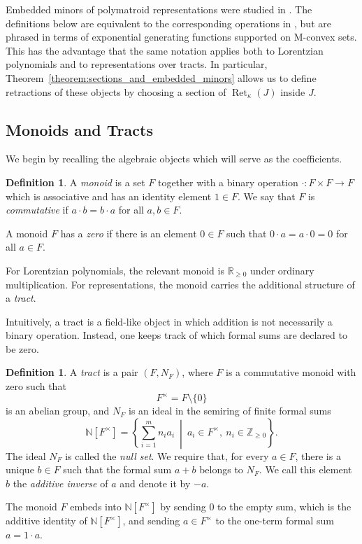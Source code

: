 \documentclass[11pt]{article}
\theoremstyle{definition}
\newtheorem{definition}[theorem]{Definition}
\theoremstyle{remark}
\newcommand{\Zgeq}{\mathbb{Z}_{\geq 0}}       %
\newcommand{\R}{\mathbb{R}}
\DeclareMathOperator{\Ret}{Ret}                %
\newcommand{\RetK}{\Ret_{\kappa}}              %
\begin{document}
Embedded minors of polymatroid representations were studied in \cite{baker2025representationtheorypolymatroids}. The definitions below are equivalent to the corresponding operations in \cite{baker2025representationtheorypolymatroids}, but are phrased in terms of exponential generating functions supported on M-convex sets. This has the advantage that the same notation applies both to Lorentzian polynomials and to representations over tracts. In particular, Theorem~\ref{theorem:sections_and_embedded_minors} allows us to define retractions of these objects by choosing a section of $\RetK(J)$ inside $J$.

\subsection{Monoids and Tracts}

We begin by recalling the algebraic objects which will serve as the coefficients.

\begin{definition}
    A \emph{monoid} is a set $F$ together with a binary operation $\cdot \colon F\times F\to F$ which is associative and has an identity element $1\in F$. We say that $F$ is \emph{commutative} if $a\cdot b=b\cdot a$ for all $a,b\in F$.

    A monoid $F$ has a \emph{zero} if there is an element $0\in F$ such that $0\cdot a=a\cdot 0=0$ for all $a\in F$.
\end{definition}

For Lorentzian polynomials, the relevant monoid is $\R_{\geq 0}$ under ordinary multiplication. For representations, the monoid carries the additional structure of a \emph{tract}.

Intuitively, a tract is a field-like object in which addition is not necessarily a binary operation. Instead, one keeps track of which formal sums are declared to be zero.

\begin{definition}
    A \emph{tract} is a pair $(F,N_F)$, where $F$ is a commutative monoid with zero such that
    \[
        F^\times = F\setminus \{0\}
    \]
    is an abelian group, and $N_F$ is an ideal in the semiring of finite formal sums
    \[
        \mathbb{N}[F^\times]
        =
        \left\{
            \sum_{i=1}^m n_i a_i
            \ \middle|\
            a_i\in F^\times,\ n_i\in\Zgeq
        \right\}.
    \]
    The ideal $N_F$ is called the \emph{null set}. We require that, for every $a\in F$, there is a unique $b\in F$ such that the formal sum $a+b$ belongs to $N_F$. We call this element $b$ the \emph{additive inverse} of $a$ and denote it by $-a$.

    The monoid $F$ embeds into $\mathbb{N}[F^\times]$ by sending $0$ to the empty sum, which is the additive identity of $\mathbb{N}[F^\times]$, and sending $a\in F^\times$ to the one-term formal sum $a=1\cdot a$.
\end{definition}
\end{document}
